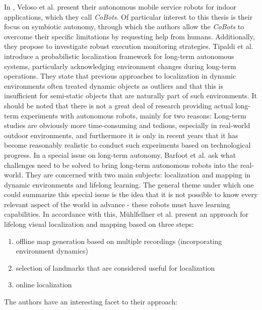 \documentclass[english, master, utf8]{base/thesis_KBS}
\begin{document}
In \cite{Veloso:2012}, Veloso et al. present their autonomous mobile service robots for indoor applications, which they call \textit{CoBots}. Of particular interest to this thesis
is their focus on symbiotic autonomy, through which the authors allow the \textit{CoBots} to overcome their specific limitations by requesting help from humans.
Additionally, they propose to investigate robust execution monitoring strategies.\newline
Tipaldi et al. \cite{Tipaldi:2013} introduce a probabilistic localization framework for long-term autonomous systems, particularly acknowledging environment changes during
long-term operations. They state that previous approaches to localization in dynamic environments often treated dynamic objects as outliers and that this is insufficient
for semi-static objects that are naturally part of such environments.\newline
It should be noted that there is not a great deal of research providing actual long-term experiments with autonomous robots, mainly for two reasons:
Long-term studies are obviously more time-consuming and tedious, especially in real-world outdoor environments, and furthermore it is only in recent years that it has become
reasonably realistic to conduct such experiments based on technological progress. \cite{Leite:2013}\newline
In a special issue on long-term autonomy, Barfoot et al. \cite{Barfoot:2013} ask what challenges need to be solved to bring long-term autonomous robots into the real-world. They are concerned with
two main subjects: localization and mapping in dynamic environments and lifelong learning. The general theme under which one could summarize this special issue is the idea that it is
not possible to know every relevant aspect of the world in advance - these robots must have learning capabilities.
In accordance with this, Mühlfellner et al. \cite{Muehlfellner:2015} present an approach for lifelong visual localization and mapping based on three steps:
\begin{enumerate}
    \item offline map generation based on multiple recordings (incorporating environment dynamics)
    \item selection of landmarks that are considered useful for localization
    \item online localization
\end{enumerate}
The authors have an interesting facet to their approach:  \cite{Muehlfellner:2015}\newline
\end{document}
